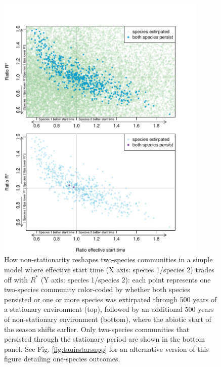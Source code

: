 \documentclass[11pt,letter]{article}
\begin{document}
\iffalse %
\begin{figure}[t!]
\centering
\includegraphics[width=0.9\textwidth]{..//..//..//R/graphs/modelruns/manuscript/tauIPrstart1_2panel.pdf}
\caption{How non-stationarity reshapes two-species communities in a simple model where effective start time (X axis: species 1/species 2) trades off with $R^*$ (Y axis: species 1/species 2): each point represents one two-species community color-coded by whether both species persisted or one or more species was extirpated through 500 years of a stationary environment (top), followed by an additional 500 years of non-stationary environment (bottom), where the abiotic start of the season shifts earlier. Only two-species communities that persisted through the stationary period are shown in the bottom panel. See Fig. \ref{fig:tauirstarsupp} for an alternative version of this figure detailing one-species outcomes.}
 \label{fig:tauirstar}
\end{figure}
\clearpage
\end{document}
